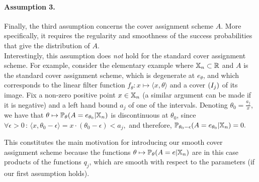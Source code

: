 \paragraph*{Assumption 3.} Finally, the third assumption concerns the cover assignment scheme $A$. More specifically, it requires the regularity and smoothness of the success probabilities that give the distribution of $A$.\\ 
    Interestingly, this assumption does {\em not} hold for the standard cover assignment scheme. For example, consider the elementary example where $\mathbb{X}_n\subset\mathbb{R}$ and $A$ is the standard cover assignment scheme, which is degenerate at $e_\theta$, and which corresponds to the linear filter function $f_\theta\colon x\mapsto  \langle x,\theta\rangle$ and a cover $(I_j)$ of its image. Fix a non-zero positive point $x\in\mathbb{X}_n$ (a similar argument can be made if it is negative) and a left hand bound $a_j$ of one of the intervals. Denoting $\theta_0=\frac{a_j}{x}$, we have that $\theta\mapsto \mathbb{P}_\theta(A=e_{\theta_0} | \mathbb{X}_n)$ is discontinuous at $\theta_0$, since $\forall \epsilon>0\,:\,\langle x,\theta_0-\epsilon\rangle=x\cdot(\theta_0-\epsilon)<a_j,$ and therefore, $\mathbb{P}_{\theta_0-\epsilon}(A=e_{\theta_0} | \mathbb{X}_n)=0.$




    
    This constitutes the main motivation for introducing our smooth cover assignment scheme because the functions $\theta\mapsto \mathbb{P}_\theta (A=e | \mathbb{X}_n)$ are in this case products of the functions $q_j$, which are smooth with respect to the parameters (if  our first assumption holds).

